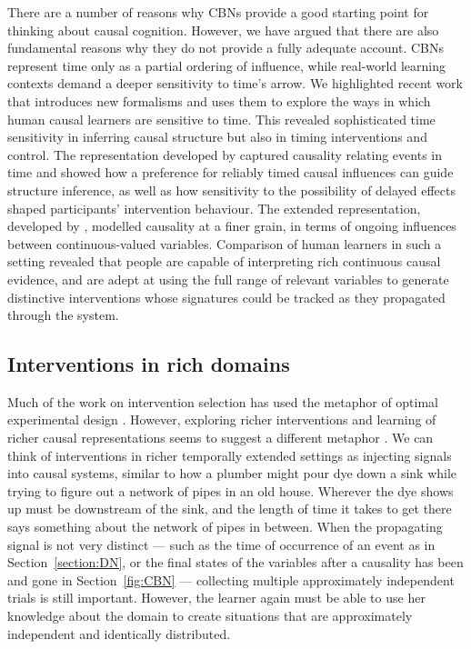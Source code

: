 \documentclass{cambridge7A}%
\begin{document}
There are a number of reasons why CBNs provide a good starting point for thinking about causal cognition.  However, we have argued that there are also fundamental reasons why they do not provide a fully adequate account.  CBNs represent time only as a partial ordering of influence, while real-world learning contexts demand a deeper sensitivity to time's arrow.  We highlighted recent work that introduces new formalisms and uses them to explore the ways in which human causal learners are sensitive to time.  This revealed sophisticated time sensitivity in inferring causal structure but also in timing interventions and control.  The representation developed by \cite{bramley2018time} captured causality relating events in time and showed how a preference for reliably timed causal influences can guide structure inference, as well as how sensitivity to the possibility of delayed effects shaped participants' intervention behaviour.  The extended representation, developed by \cite{davis2018ctcv}, modelled causality at a finer grain, in terms of ongoing influences between continuous-valued variables. Comparison of human learners in such a setting revealed that people are capable of interpreting rich continuous causal evidence, and are adept at using the full range of relevant variables to generate distinctive interventions whose signatures could be tracked as they propagated through the system.

\subsection{Interventions in rich domains}

Much of the work on intervention selection has used the metaphor of optimal experimental design \citep{fedorov1972theory}.  However, exploring richer interventions and learning of richer causal representations seems to suggest a different metaphor \citep{coenen2017asking}.  We can think of interventions in richer temporally extended settings as injecting signals into causal systems, similar to how a plumber might pour dye down a sink while trying to figure out a network of pipes in an old house.  Wherever the dye shows up must be downstream of the sink, and the length of time it takes to get there says something about the network of pipes in between.  When the propagating signal is not very distinct --- such as the time of occurrence of an event as in Section~\ref{section:DN}, or the final states of the variables after a causality has been and gone in Section~\ref{fig:CBN} --- collecting multiple approximately independent trials is still important.  However, the learner again must be able to use her knowledge about the domain to create situations that are approximately independent and identically distributed. 
\end{document}
